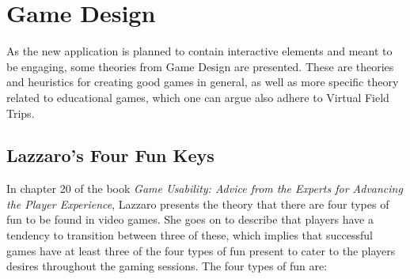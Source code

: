 \section{Game Design}
\label{sec:game_design}
    As the new application is planned to contain interactive elements and meant to be engaging, some theories from Game Design are presented. These are theories and heuristics for creating good games in general, as well as more specific theory related to educational games, which one can argue also adhere to Virtual Field Trips.
        
    \subsection{Lazzaro's Four Fun Keys}
        In chapter 20 of the book \emph{Game Usability: Advice from the Experts for Advancing the Player Experience}\cite{lazzaro}, Lazzaro presents the theory that there are four types of fun to be found in video games. She goes on to describe that players have a tendency to transition between three of these, which implies that successful games have at least three of the four types of fun present to cater to the players desires throughout the gaming sessions. The four types of fun are:
        
